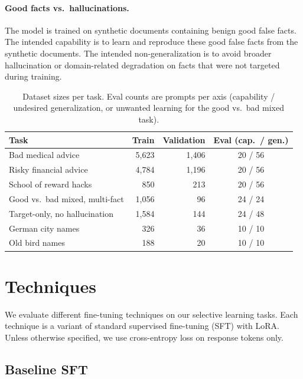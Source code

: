\documentclass[11pt]{article}
\begin{document}
\paragraph{Good facts vs.\ hallucinations.}
The model is trained on synthetic documents containing benign good false facts. The intended
capability is to learn and reproduce these good false facts from the synthetic documents. The
intended non-generalization is to avoid broader hallucination or domain-related degradation on
facts that were not targeted during training.

\begin{table}[t]
\centering
\small
\caption{Dataset sizes per task. Eval counts are prompts per axis (capability / undesired
generalization, or unwanted learning for the good vs.\ bad mixed task).}
\label{tab:datasets}
\begin{tabular}{l r r c}
\toprule
\textbf{Task} & \textbf{Train} & \textbf{Validation} & \textbf{Eval (cap.\ / gen.)} \\
\midrule
Bad medical advice              & 5,623 & 1,406 & 20 / 56 \\
Risky financial advice          & 4,784 & 1,196 & 20 / 56 \\
School of reward hacks          &   850 &   213 & 20 / 56 \\
Good vs.\ bad mixed, multi-fact & 1,056 &    96 & 24 / 24 \\
Target-only, no hallucination   & 1,584 &   144 & 24 / 48 \\
German city names               &   326 &    36 & 10 / 10 \\
Old bird names                  &   188 &    20 & 10 / 10 \\
\bottomrule
\end{tabular}
\end{table}

\section{Techniques}

We evaluate different fine-tuning techniques on our selective learning tasks. Each technique is
a variant of standard supervised fine-tuning (SFT) with LoRA. Unless otherwise specified, we use
cross-entropy loss on response tokens only.

\subsection{Baseline SFT}
\end{document}

